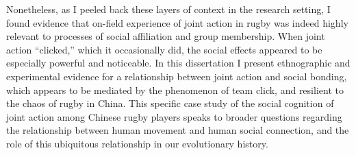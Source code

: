 Nonetheless, as I peeled back these layers of context in the research setting, I found evidence that on-field experience of joint action in rugby was indeed highly relevant to processes of social affiliation and group membership. When joint action ``clicked,'' which it occasionally did,  the social effects appeared to be especially powerful and noticeable.   In this dissertation I present ethnographic and experimental evidence for a relationship between joint action and social bonding, which appears to be mediated by the phenomenon of team click, and resilient to the chaos of rugby in China.  This specific case study of the social cognition of joint action among Chinese rugby players speaks to broader questions regarding the relationship between human movement and human social connection, and the role of this ubiquitous relationship in our evolutionary history.
